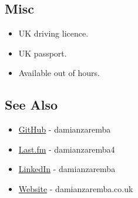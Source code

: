 \subsection{Misc}\label{misc}

\begin{itemize}
\itemsep1pt\parskip0pt
\item
  UK driving licence.
\item
  UK passport.
\item
  Available out of hours.
\end{itemize}

\subsection{See Also}\label{see-also}

\begin{itemize}
\itemsep1pt\parskip0pt
\item
  \href{https://github.com/damianzaremba}{GitHub} - damianzaremba
\item
  \href{http://last.fm/user/damianzaremba4}{Last.fm} - damianzaremba4
\item
  \href{http://uk.linkedin.com/in/damianzaremba}{LinkedIn} -
  damianzaremba
\item
  \href{http://damianzaremba.co.uk}{Website} - damianzaremba.co.uk
\end{itemize}
